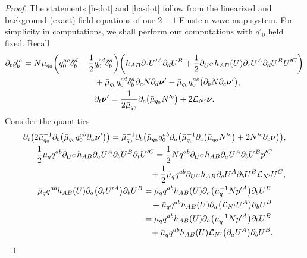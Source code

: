 \documentclass[11pt]{article}
\numberwithin{equation}{section}
\def\ptl{\partial}%
\def\mbo#1{\boldsymbol{#1}}%
\def\halb{\frac{1}{2}}%
\numberwithin{equation}{section}
\begin{document}
\begin{proof}
The statements \eqref{h-dot} and \eqref{ha-dot} follow from the linearized and background (exact) field equations of our $2+1$ Einstein-wave map system. For simplicity in computations, we shall perform our computations with $q'_0$
held fixed. Recall
\begin{gather*}
\ptl_t \varrho'^a_b = N \bar{\mu}_{q_0} \biggl(q^{ac}_0 \delta^d_b - \halb q_0^{cd} \delta^a_b\biggr) \biggl(h_{AB} \ptl_c U'^A \ptl_d U^B + \halb \ptl_{U^C} h_{AB} (U) \ptl_c U^A \ptl_d U^B U'^C\biggr) \notag\\ \hphantom{\ptl_t \varrho'^a_b =}{}
+ \bar{\mu}_{q_0} q_0^{cd} \delta^a_b \ptl_c N \ptl_d \mbo{\nu}' - \bar{\mu}_{q_0} q^{ac}_0 \bigl(\ptl_b N \ptl_c \mbo{\nu}'\bigr), \\
\ptl_t \mbo{\nu}'= \frac{1}{2 \bar{\mu}_{q_0}} \ptl_c \bigl(\bar{\mu}_{q_0} N'^c\bigr) + 2 \mathcal{L}_{N'} \mbo{\nu}.
\end{gather*}
Consider the quantities
\begin{gather*}
\ptl_t \bigl(2 \bar{\mu}^{-1}_{q_0} \ptl_b \bigl(\bar{\mu}_{q_0} q^{ab}_0 \ptl_a \mbo{\nu}'\bigr) \bigr) = \bar{\mu}^{-1}_{q_0} \ptl_b \bigl(\bar{\mu}_{q_0} q^{ab}_0 \ptl_a \bigl( \bar{\mu}^{-1}_{q_0} \ptl_c \bigl(\bar{\mu}_{q_0} N'^c\bigr) + 2 N'^c\ptl_c \mbo{\nu}\bigr)\bigr),
\\
\halb \bar{\mu}_q q^{ab} \ptl_{U^C} h_{AB} \ptl_a U^A \ptl_b U^B \ptl_t U'^C = \halb N q^{ab} \ptl_{U^C} h_{AB} \ptl_a U^A \ptl_b U^B p'^C \notag\\
\hphantom{\halb \bar{\mu}_q q^{ab} \ptl_{U^C} h_{AB} \ptl_a U^A \ptl_b U^B \ptl_t U'^C =}{}
+ \halb \bar{\mu}_q q^{ab} \ptl_{U^C} h_{AB} \ptl_a U^A \ptl_b U^B \mathcal{L}_{N'} U^C, \\
 \bar{\mu}_q q^{ab} h_{AB}(U) \ptl_a \bigl(\ptl_t U'^A\bigr) \ptl_b U^B= \bar{\mu}_q q ^{ab} h_{AB}(U) \ptl_a \bigl(\bar{\mu}^{-1}_q N p'^A\bigr)
 \ptl_b U^B \notag\\ \hphantom{\bar{\mu}_q q^{ab} h_{AB}(U) \ptl_a \bigl(\ptl_t U'^A\bigr) \ptl_b U^B=}{}
 + \bar{\mu}_q q ^{ab} h_{AB}(U) \ptl_a \bigl(\mathcal{L}_{N'} U^A\bigr) \ptl_b U^B
 \notag\\ \hphantom{\bar{\mu}_q q^{ab} h_{AB}(U) \ptl_a \bigl(\ptl_t U'^A\bigr) \ptl_b U^B}{}
 = \bar{\mu}_q q ^{ab} h_{AB}(U) \ptl_a \bigl(\bar{\mu}^{-1}_q N p'^A\bigr)\ptl_b U^B
 \notag\\ \hphantom{\bar{\mu}_q q^{ab} h_{AB}(U) \ptl_a \bigl(\ptl_t U'^A\bigr) \ptl_b U^B=}{}
 + \bar{\mu}_q q ^{ab} h_{AB}(U) \mathcal{L}_{N'} \bigl(\ptl_a U^A\bigr) \ptl_b U^B.

\end{gather*}
\end{proof}
\end{document}
